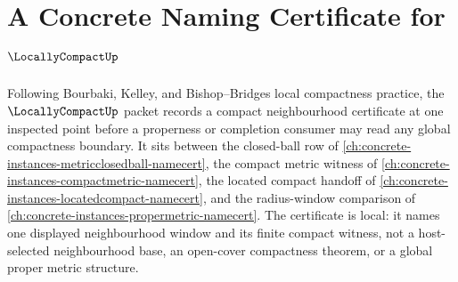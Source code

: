 \chapter{A Concrete Naming Certificate for $\LocallyCompactUp$}
\label{ch:concrete-instances-locallycompact-namecert}

Following Bourbaki, Kelley, and Bishop--Bridges local compactness practice, the $\LocallyCompactUp$ packet records a compact neighbourhood certificate at one inspected point before a properness or completion consumer may read any global compactness boundary. It sits between the closed-ball row of \autoref{ch:concrete-instances-metricclosedball-namecert}, the compact metric witness of \autoref{ch:concrete-instances-compactmetric-namecert}, the located compact handoff of \autoref{ch:concrete-instances-locatedcompact-namecert}, and the radius-window comparison of \autoref{ch:concrete-instances-propermetric-namecert}. The certificate is local: it names one displayed neighbourhood window and its finite compact witness, not a host-selected neighbourhood base, an open-cover compactness theorem, or a global proper metric structure.

